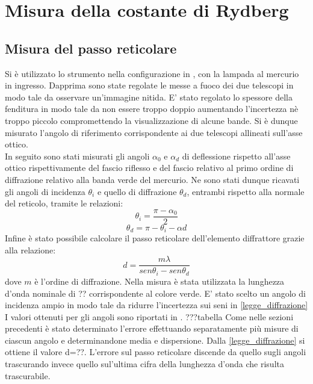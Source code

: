 \section{Misura della costante di Rydberg}

\subsection{Misura del passo reticolare}
Si è utilizzato lo strumento nella configurazione in , con la lampada al mercurio in ingresso. Dapprima sono state regolate le messe a fuoco dei due telescopi in modo tale da osservare un'immagine nitida. E' stato regolato lo spessore della fenditura in modo tale da non essere troppo doppio aumentando l'incertezza nè troppo piccolo compromettendo la visualizzazione di alcune bande. Si è dunque misurato l'angolo di riferimento corrispondente ai due telescopi allineati sull'asse ottico.\\
 In seguito sono stati misurati gli angoli $\alpha_{0}$ e $\alpha_{d}$ di deflessione rispetto all'asse ottico rispettivamente del fascio riflesso e del fascio relativo al primo ordine di diffrazione relativo alla banda verde del mercurio. Ne sono stati dunque ricavati gli angoli di incidenza $\theta_{i}$ e quello di diffrazione $\theta_{d}$, entrambi rispetto alla normale del reticolo, tramite le relazioni:
 \begin{equation}
 \theta_{i}=\frac{\pi-\alpha_{0}}{2}
 \end{equation}
 \begin{equation}
  \theta_{d}=\pi-\theta_{i}-\alpha{d}
 \end{equation}
 Infine è stato possibile calcolare il passo reticolare dell'elemento diffrattore grazie alla relazione:
\begin{equation}
d = \frac{m\lambda}{sen\theta_{i} - sen\theta_{d}}
\label{legge_diffrazione}
\end{equation} dove $m$ è l'ordine di diffrazione. Nella misura è stata utilizzata la lunghezza d'onda nominale di ?? corrispondente al colore verde. E' stato scelto un angolo di incidenza ampio in modo tale da ridurre l'incertezza sui seni in \ref{legge_diffrazione}\\

I valori ottenuti per gli angoli sono riportati in .
???tabella
Come nelle sezioni precedenti è stato determinato l'errore effettuando separatamente più misure di ciascun angolo e determinandone media e dispersione.
\newline
Dalla \ref{legge_diffrazione} si ottiene il valore  d=??. L'errore sul passo reticolare discende da quello sugli angoli trascurando invece quello sul'ultima cifra della lunghezza d'onda che risulta trascurabile.

